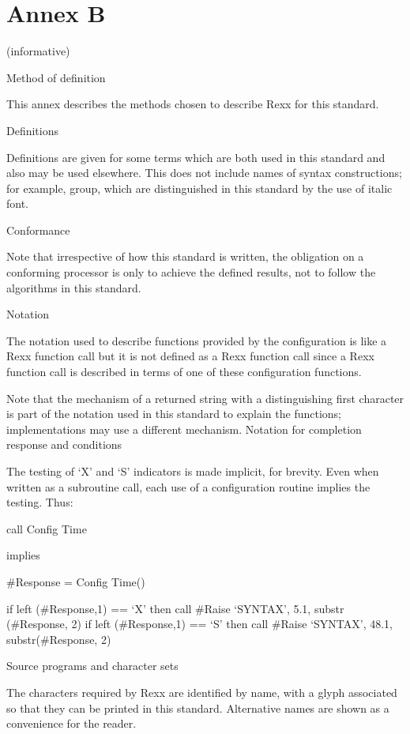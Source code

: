\chapter{Annex B}\label{annex-b}

(informative)

Method of definition

This annex describes the methods chosen to describe Rexx for this
standard.

Definitions

Definitions are given for some terms which are both used in this
standard and also may be used elsewhere. This does not include names of
syntax constructions; for example, group, which are distinguished in
this standard by the use of italic font.

Conformance

Note that irrespective of how this standard is written, the obligation
on a conforming processor is only to achieve the defined results, not to
follow the algorithms in this standard.

Notation

The notation used to describe functions provided by the configuration is
like a Rexx function call but it is not defined as a Rexx function call
since a Rexx function call is described in terms of one of these
configuration functions.

Note that the mechanism of a returned string with a distinguishing first
character is part of the notation used in this standard to explain the
functions; implementations may use a different mechanism. Notation for
completion response and conditions

The testing of `X' and `S' indicators is made implicit, for brevity.
Even when written as a subroutine call, each use of a configuration
routine implies the testing. Thus:

call Config Time

implies

\#Response = Config Time()

if left (\#Response,1) == `X' then call \#Raise `SYNTAX', 5.1, substr
(\#Response, 2) if left (\#Response,1) == `S' then call \#Raise
`SYNTAX', 48.1, substr(\#Response, 2)

Source programs and character sets

The characters required by Rexx are identified by name, with a glyph
associated so that they can be printed in this standard. Alternative
names are shown as a convenience for the reader.


